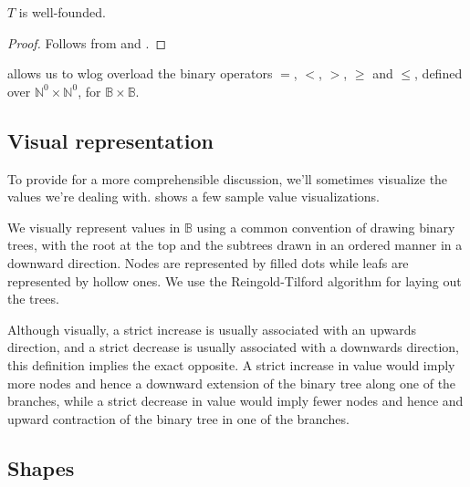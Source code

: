 \begin{corollary} $T$ is well-founded.\end{corollary}

\begin{proof} Follows from  and
.\end{proof} 

\begin{definition}  allows us to wlog overload the
binary operators $=$, $<$, $>$, $\geq$ and $\leq$, defined over
$\mathbb{N}^0\times\mathbb{N}^0$, for
$\mathbb{B}\times\mathbb{B}$.\end{definition}

\subsection{Visual representation}

To provide for a more comprehensible discussion, we'll sometimes visualize the
values we're dealing with.  shows a few
sample value visualizations.

\begin{definition}\label{definition:value-visualization} We visually represent
values in $\mathbb{B}$ using a common convention of drawing binary trees, with
the root at the top and the subtrees drawn in an ordered manner in a downward
direction. Nodes are represented by filled dots while leafs are represented by
hollow ones. We use the Reingold-Tilford algorithm\cite{reingold-tilford} for
laying out the trees.\end{definition}


Although visually, a strict increase is usually associated with an upwards
direction, and a strict decrease is usually associated with a downwards
direction, this definition implies the exact opposite. A strict increase in
value would imply more nodes and hence a downward extension of the binary tree
along one of the branches, while a strict decrease in value would imply fewer
nodes and hence and upward contraction of the binary tree in one of the
branches.

\subsection{Shapes}

